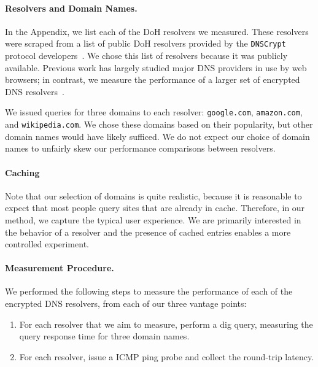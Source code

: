 \paragraph{Resolvers and Domain Names.} In the Appendix, we list each of 
the DoH resolvers we measured.  These resolvers were
scraped from a list of public DoH resolvers provided by the \texttt{DNSCrypt}
protocol developers~\cite{dnscrypt-public-resolvers}.
We chose this list of resolvers because it was publicly available.
Previous work has largely studied major DNS providers in use by web browsers; in contrast, we
measure the performance of a larger set of encrypted DNS resolvers~\cite{hounsel2020comparing,hounsel2021can,hoang2020k,lu2019end-to-end}.

We issued queries for three domains to each resolver: \texttt{google.com}, 
\texttt{amazon.com}, and \texttt{wikipedia.com}.  We chose these domains based on their popularity, but
other domain names would have likely sufficed.  We do not expect our choice of
domain names to unfairly skew our performance comparisons between resolvers. 

\paragraph{Caching}
Note that our selection of domains is quite realistic, because it is reasonable to expect that most people query sites that are already in cache. 
Therefore, in our method, we capture the typical user experience.
We are primarily interested in the behavior of a resolver and the presence of cached entries enables a more controlled experiment.

\paragraph{Measurement Procedure.} We performed the following steps to measure
the performance of each of the encrypted DNS resolvers, from each of our three vantage points:
\begin{enumerate} 
        \item For each resolver that we aim to measure, perform a dig query, measuring the query response time for three
            domain names.
    \item For each resolver, issue a ICMP ping
            probe and collect the round-trip latency. 
\end{enumerate}

